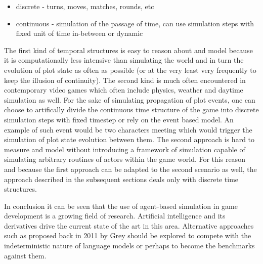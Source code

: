 \begin{itemize}
    \item discrete - turns, moves, matches, rounds, etc
    \item continuous - simulation of the passage of time, can use simulation steps with fixed unit of time in-between or dynamic
\end{itemize}

The first kind of temporal structures is easy to reason about and model because it is computationally less intensive than simulating the world and in turn the evolution of plot state as often as possible (or at the very least very frequently to keep the illusion of continuity).
The second kind is much often encountered in contemporary video games which often include physics, weather and daytime simulation as well.
For the sake of simulating propagation of plot events, one can choose to artifically divide the continuous time structure of the game into discrete simulation steps with fixed timestep or rely on the event based model.
An example of such event would be two characters meeting which would trigger the simulation of plot state evolution between them.
The second approach is hard to measure and model without introducing a framework of simulation capable of simulating arbitrary routines of actors within the game world.
For this reason and because the first approach can be adapted to the second scenario as well, the approach described in the subsequent sections deals only with discrete time structures.

In conclusion it can be seen that the use of agent-based simulation in game development is a growing field of research.
Artificial intelligence and its derivatives drive the current state of the art in this area.
Alternative approaches such as proposed back in 2011 by Grey\cite{grey2011procedural} should be explored to compete with the indeterministic nature of language models or perhaps to become the benchmarks against them.